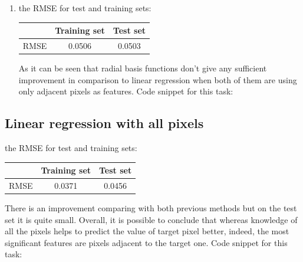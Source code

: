 \documentclass{article}
\begin{document}
\begin{enumerate}[label=(\alph*)]
				 \item
					the RMSE for test and training sets:
					\begin{center}
						\begin{tabular}{| c | c | c |}
							\hline
							\, & Training set & Test set \\ \hline
							RMSE  & 0.0506 & 0.0503 \\ 
							\hline
						\end{tabular}
					\end{center}
					As it can be seen that radial basis functions don't give any sufficient improvement in comparison to linear regression when both of them are using only adjacent pixels as features.
				 	Code snippet for this task:
				 	
			\end{enumerate}
			 
		\subsection{Linear regression with all pixels}
			the RMSE for test and training sets:
			\begin{center}
				\begin{tabular}{| c | c | c |}
					\hline
					\, & Training set & Test set \\ \hline
					RMSE  &  0.0371 & 0.0456 \\ 
					\hline
				\end{tabular}
			\end{center}
			There is an improvement comparing with both previous methods but on the test set it is quite small. Overall, it is possible to conclude that whereas knowledge of all the pixels helps to predict the value of target pixel better, indeed, the most significant features are pixels adjacent to the target one.
			Code snippet for this task:
			
\end{document}
